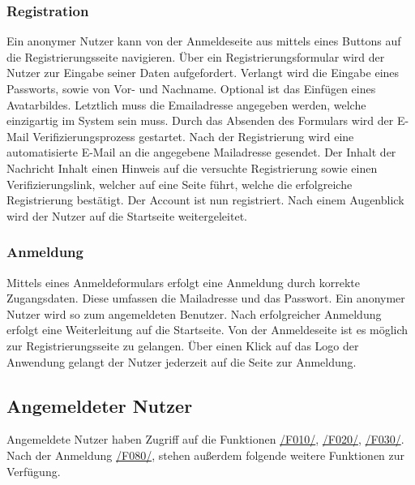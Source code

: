 \subsubsection{Registration}
\begin{description}
     Ein anonymer Nutzer kann von der Anmeldeseite aus mittels eines
    Buttons auf die Registrierungsseite navigieren.
     Über ein Registrierungsformular wird der Nutzer zur Eingabe seiner
    Daten aufgefordert. Verlangt wird die Eingabe eines Passworts,
    sowie von Vor- und Nachname. Optional ist das Einfügen eines Avatarbildes. Letztlich muss die Emailadresse
    angegeben werden, welche einzigartig im System sein muss. Durch das Absenden des Formulars wird der E-Mail Verifizierungsprozess
    gestartet.
     Nach der Registrierung wird eine automatisierte E-Mail
    an die angegebene Mailadresse gesendet. Der Inhalt der Nachricht Inhalt einen Hinweis auf
    die versuchte Registrierung sowie einen Verifizierungslink, welcher auf eine Seite führt, welche
    die erfolgreiche Registrierung bestätigt. Der Account ist nun registriert. Nach einem Augenblick wird der Nutzer
    auf die Startseite weitergeleitet.
\end{description}

\subsubsection{Anmeldung}
\begin{description}
     Mittels eines Anmeldeformulars erfolgt eine Anmeldung durch korrekte Zugangsdaten.
    Diese umfassen die Mailadresse und das Passwort. Ein anonymer Nutzer wird so zum angemeldeten Benutzer.
    Nach erfolgreicher Anmeldung erfolgt eine Weiterleitung auf die Startseite.
     Von der Anmeldeseite ist es möglich zur Registrierungsseite zu gelangen.
    \XXitem{} Über einen Klick auf das Logo der Anwendung gelangt der Nutzer jederzeit
    auf die Seite zur Anmeldung.
\end{description}

\subsection{Angemeldeter Nutzer}
Angemeldete Nutzer haben Zugriff auf die Funktionen
\hyperref[funkt:010]{/F010/}, \hyperref[funkt:020]{/F020/}, \hyperref[funkt:030]{/F030/}.
Nach der Anmeldung \hyperref[funkt:080]{/F080/},
stehen außerdem folgende weitere Funktionen zur Verfügung.

